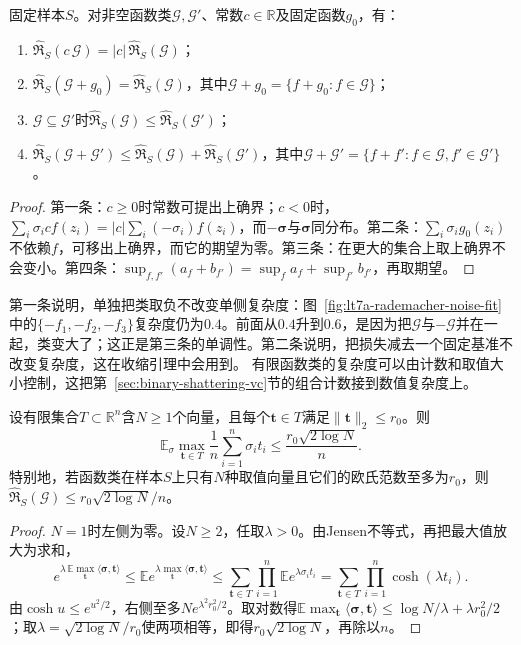\begin{lemma}[缩放、平移与求和]
\label{lem:rademacher-basic-operations}
固定样本$S$。对非空函数类$\mathcal G,\mathcal G'$、常数$c\in\mathbb R$及固定函数$g_0$，有：
\begin{enumerate}
 \item $\widehat{\mathfrak R}_S(c\,\mathcal G)=|c|\,\widehat{\mathfrak R}_S(\mathcal G)$；
 \item $\widehat{\mathfrak R}_S(\mathcal G+g_0)=\widehat{\mathfrak R}_S(\mathcal G)$，其中$\mathcal G+g_0=\{f+g_0:f\in\mathcal G\}$；
 \item $\mathcal G\subseteq\mathcal G'$时$\widehat{\mathfrak R}_S(\mathcal G)\leq\widehat{\mathfrak R}_S(\mathcal G')$；
 \item $\widehat{\mathfrak R}_S(\mathcal G+\mathcal G')\leq\widehat{\mathfrak R}_S(\mathcal G)+\widehat{\mathfrak R}_S(\mathcal G')$，其中$\mathcal G+\mathcal G'=\{f+f':f\in\mathcal G,f'\in\mathcal G'\}$。
\end{enumerate}
\end{lemma}
\begin{proof}
第一条：$c\geq0$时常数可提出上确界；$c<0$时，$\sum_i\sigma_icf(z_i)=|c|\sum_i(-\sigma_i)f(z_i)$，而$-\bm\sigma$与$\bm\sigma$同分布。第二条：$\sum_i\sigma_ig_0(z_i)$不依赖$f$，可移出上确界，而它的期望为零。第三条：在更大的集合上取上确界不会变小。第四条：$\sup_{f,f'}(a_f+b_{f'})=\sup_fa_f+\sup_{f'}b_{f'}$，再取期望。
\end{proof}

第一条说明，单独把类取负不改变单侧复杂度：图~\ref{fig:lt7a-rademacher-noise-fit}中的$\{-f_1,-f_2,-f_3\}$复杂度仍为$0.4$。前面从$0.4$升到$0.6$，是因为把$\mathcal G$与$-\mathcal G$并在一起，类变大了；这正是第三条的单调性。第二条说明，把损失减去一个固定基准不改变复杂度，这在收缩引理中会用到。
有限函数类的复杂度可以由计数和取值大小控制，这把第~\ref{sec:binary-shattering-vc}节的组合计数接到数值复杂度上。

\begin{lemma}[Massart引理]
\label{lem:rademacher-massart}
设有限集合$T\subset\mathbb R^n$含$N\geq1$个向量，且每个$\bm t\in T$满足$\|\bm t\|_2\leq r_0$。则
\[
 \mathbb E_\sigma\max_{\bm t\in T}\frac1n\sum_{i=1}^n\sigma_it_i
 \leq\frac{r_0\sqrt{2\log N}}{n}.
\]
特别地，若函数类在样本$S$上只有$N$种取值向量且它们的欧氏范数至多为$r_0$，则$\widehat{\mathfrak R}_S(\mathcal G)\leq r_0\sqrt{2\log N}/n$。
\end{lemma}
\begin{proof}
$N=1$时左侧为零。设$N\geq2$，任取$\lambda>0$。由Jensen不等式，再把最大值放大为求和，
\[
 e^{\lambda\,\mathbb E\max_{\bm t}\langle\bm\sigma,\bm t\rangle}
 \leq\mathbb E e^{\lambda\max_{\bm t}\langle\bm\sigma,\bm t\rangle}
 \leq\sum_{\bm t\in T}\prod_{i=1}^n\mathbb E e^{\lambda\sigma_it_i}
 =\sum_{\bm t\in T}\prod_{i=1}^n\cosh(\lambda t_i).
\]
由$\cosh u\leq e^{u^2/2}$，右侧至多$Ne^{\lambda^2r_0^2/2}$。取对数得$\mathbb E\max_{\bm t}\langle\bm\sigma,\bm t\rangle\leq\log N/\lambda+\lambda r_0^2/2$；取$\lambda=\sqrt{2\log N}/r_0$使两项相等，即得$r_0\sqrt{2\log N}$，再除以$n$。
\end{proof}

